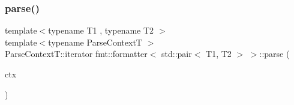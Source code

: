 \mbox{\label{structfmt_1_1formatter_3_01std_1_1pair_3_01_t1_00_01_t2_01_4_01_4_a720777838beec8c8c0315b398262e519}} 
\subsubsection{\texorpdfstring{parse()}{parse()}}
{\footnotesize\ttfamily template$<$typename T1 , typename T2 $>$ \\
template$<$typename Parse\+ContextT $>$ \\
Parse\+Context\+T\+::iterator fmt\+::formatter$<$ std\+::pair$<$ T1, T2 $>$ $>$\+::parse (\begin{DoxyParamCaption}\item[{Parse\+ContextT \&}]{ctx }\end{DoxyParamCaption})}

